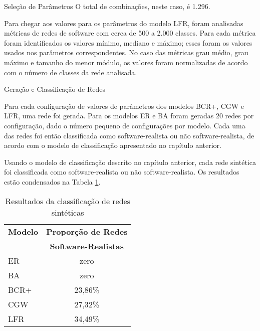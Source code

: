\begin{section}{Seleção de Parâmetros}
O total de combinações, neste caso, é 1.296.

Para chegar aos valores para os parâmetros do modelo LFR, foram analisadas métricas de redes de software com cerca de 500 a 2.000 classes. Para cada métrica foram identificados os valores mínimo, mediano e máximo; esses foram os valores usados nos parâmetros correspondentes. No caso das métricas grau médio, grau máximo e tamanho do menor módulo, os valores foram normalizadas de acordo com o número de classes da rede analisada.


\end{section}

\begin{section}{Geração e Classificação de Redes}
	
	Para cada configuração de valores de parâmetros dos modelos BCR+, CGW e LFR, uma rede foi gerada. Para os modelos ER e BA foram geradas 20 redes por configuração, dado o número pequeno de configurações por modelo. Cada uma das redes foi então classificada como software-realista ou não software-realista, de acordo com o modelo de classificação apresentado no capítulo anterior.

	
Usando o modelo de classificação descrito no capítulo anterior, cada rede sintética foi classificada como software-realista ou não software-realista. Os resultados estão condensados na Tabela \ref{tab:results}.

\begin{table}
\caption{Resultados da classificação de redes sintéticas}
\centering
\begin{tabular}{|l|c|}
\hline
\textbf{Modelo} & \textbf{Proporção de Redes} \\ & \textbf{Software-Realistas} \\
\hline 
\hline
ER & zero \\ %
\hline
BA & zero \\ %
\hline
BCR+ & 23,86\% \\ %
\hline
CGW  & 27,32\% \\  %
\hline
LFR  & 34,49\% \\ %
\hline
\end{tabular}
\label{tab:results}
\end{table}


\end{section}
